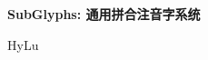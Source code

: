 \documentclass[12pt]{article}
\numberwithin{equation}{section}
\begin{document}

\begin{center}
    {\Huge \textbf{SubGlyphs: 通用拼合注音字系统} \par}
    {\Large HyLu \par}
    \hrulefill
\end{center}






\end{document}
